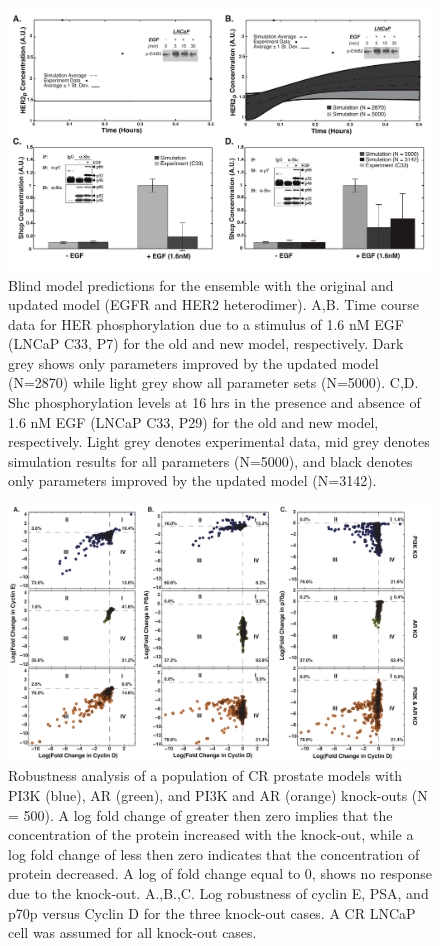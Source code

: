 \documentclass[12pt]{article}
\begin{document}
\begin{figure}\centering
\includegraphics[width=1.0\textwidth]{./figs/Supp_Figure_NewModelvsOldModel}
\caption{Blind model predictions for the ensemble with the original and updated model (EGFR and HER2 heterodimer). A,B. Time course data for HER phosphorylation due to a stimulus of 1.6 nM EGF (LNCaP C33, P7) for the old and new model, respectively. Dark grey shows only parameters improved by the updated model (N=2870) while light grey show all parameter sets (N=5000). C,D. Shc phosphorylation levels at 16 hrs in the presence and absence of 1.6 nM EGF (LNCaP C33, P29) for the old and new model, respectively. Light grey denotes experimental data, mid grey denotes simulation results for all parameters (N=5000), and black denotes only parameters improved by the updated model (N=3142).}
\label{fg:Exps_NewModelvsOldModel}
\end{figure}


\begin{figure}\centering
\includegraphics[width=1.0\textwidth]{./figs/Fig_6_PI3K_AR_KO_3_Cases.pdf}
\caption{Robustness analysis of a population of CR prostate models with PI3K (blue), AR (green), and PI3K and AR (orange) knock-outs (N = 500). A log fold change of greater then zero implies that the concentration of the protein increased with the knock-out, while a log fold change of less then zero indicates that the concentration of protein decreased. A log of fold change equal to 0, shows no response due to the knock-out.
 A.,B.,C. Log robustness of cyclin E, PSA, and p70p versus Cyclin D for the three knock-out cases. A CR LNCaP cell was assumed for all knock-out cases.}
\label{fg:Supp_Dual_Knockout}
\end{figure}
\end{document}
